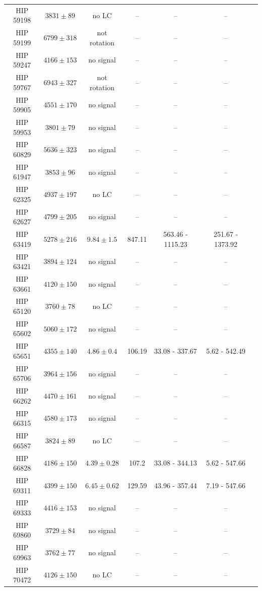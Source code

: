 \begin{longtable}{|c|c|c|c|c|c|c|}
HIP 59198 & $ 3831 \pm 89 $ & no LC &-- &-- &-- \\
HIP 59199 & $ 6799 \pm 318 $ & not rotation &-- &-- &-- \\
HIP 59247 & $ 4166 \pm 153 $ & no signal &-- &-- &-- \\
HIP 59767 & $ 6943 \pm 327 $ & not rotation &-- &-- &-- \\
HIP 59905 & $ 4551 \pm 170 $ & no signal &-- &-- &-- \\
HIP 59953 & $ 3801 \pm 79 $ & no signal &-- &-- &-- \\
HIP 60829 & $ 5636 \pm 323 $ & no signal &-- &-- &-- \\
HIP 61947 & $ 3853 \pm 96 $ & no signal &-- &-- &-- \\
HIP 62325 & $ 4937 \pm 197 $ & no LC &-- &-- &-- \\
HIP 62627 & $ 4799 \pm 205 $ & no signal &-- &-- &-- \\
HIP 63419 & $ 5278 \pm 216 $ &$ 9.84 \pm 1.5 $ & 847.11 & 563.46 - 1115.23 & 251.67 - 1373.92 \\
HIP 63421 & $ 3894 \pm 124 $ & no signal &-- &-- &-- \\
HIP 63661 & $ 4120 \pm 150 $ & no signal &-- &-- &-- \\
HIP 65120 & $ 3760 \pm 78 $ & no LC &-- &-- &-- \\
HIP 65602 & $ 5060 \pm 172 $ & no signal &-- &-- &-- \\
HIP 65651 & $ 4355 \pm 140 $ &$ 4.86 \pm 0.4 $ & 106.19 & 33.08 - 337.67 & 5.62 - 542.49 \\
HIP 65706 & $ 3964 \pm 156 $ & no signal &-- &-- &-- \\
HIP 66262 & $ 4470 \pm 161 $ & no signal &-- &-- &-- \\
HIP 66315 & $ 4580 \pm 173 $ & no signal &-- &-- &-- \\
HIP 66587 & $ 3824 \pm 89 $ & no LC &-- &-- &-- \\
HIP 66828 & $ 4186 \pm 150 $ &$ 4.39 \pm 0.28 $ & 107.2 & 33.08 - 344.13 & 5.62 - 547.66 \\
HIP 69311 & $ 4399 \pm 150 $ &$ 6.45 \pm 0.62 $ & 129.59 & 43.96 - 357.44 & 7.19 - 547.66 \\
HIP 69333 & $ 4416 \pm 153 $ & no signal &-- &-- &-- \\
HIP 69860 & $ 3729 \pm 84 $ & no signal &-- &-- &-- \\
HIP 69963 & $ 3762 \pm 77 $ & no signal &-- &-- &-- \\
HIP 70472 & $ 4126 \pm 150 $ & no LC &-- &-- &-- \\

\end{longtable}
